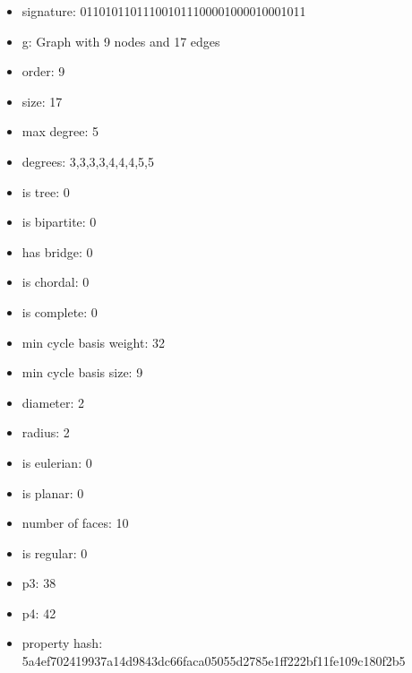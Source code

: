 \newpage
\begin{figure}
\end{figure}
\begin{itemize}
\item signature: 011010110111001011100001000010001011
\item g: Graph with 9 nodes and 17 edges
\item order: 9
\item size: 17
\item max degree: 5
\item degrees: 3,3,3,3,4,4,4,5,5
\item is tree: 0
\item is bipartite: 0
\item has bridge: 0
\item is chordal: 0
\item is complete: 0
\item min cycle basis weight: 32
\item min cycle basis size: 9
\item diameter: 2
\item radius: 2
\item is eulerian: 0
\item is planar: 0
\item number of faces: 10
\item is regular: 0
\item p3: 38
\item p4: 42
\item property hash: 5a4ef702419937a14d9843dc66faca05055d2785e1ff222bf11fe109c180f2b5
\end{itemize}
